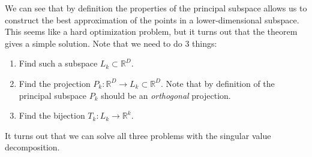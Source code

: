     We can see that by definition the properties of the principal subspace allows us to construct the best approximation of the points in a lower-dimensional subspace. This seems like a hard optimization problem, but it turns out that the theorem gives a simple solution. Note that we need to do 3 things: 
    \begin{enumerate}
      \item Find such a subspace $L_k \subset \mathbb{R}^D$. 
      \item Find the projection $P_k: \mathbb{R}^D \rightarrow L_k \subset \mathbb{R}^D$. Note that by definition of the principal subspace $P_k$ should be an \textit{orthogonal} projection. 
      \item Find the bijection $T_k: L_k \rightarrow \mathbb{R}^k$. 
    \end{enumerate}
    It turns out that we can solve all three problems with the singular value decomposition. 

